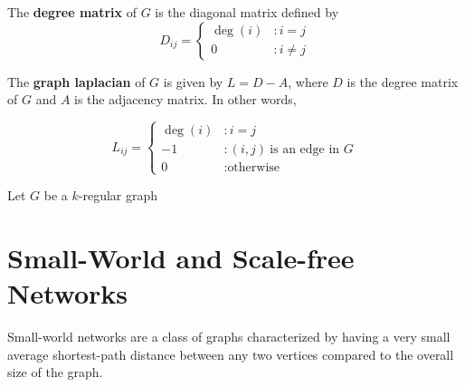 \begin{definition}
  The \textbf{degree matrix} of $G$ is the diagonal matrix defined by
  \[
    D_{ij} = \begin{cases}
      \deg(i) &: i = j \\
      0 &: i \neq j
    \end{cases}
  \]
\end{definition}

\begin{definition}
  The \textbf{graph laplacian} of $G$ is given by $L = D - A$, where $D$ is the
  degree matrix of $G$ and $A$ is the adjacency matrix. In other words,

  \[
    L_{ij} = \begin{cases}
      \deg(i) &: i=j \\
      -1 &: (i,j) ~\text{is an edge in $G$} \\
      0 &: \text{otherwise}
    \end{cases}
  \]
\end{definition}

\begin{proposition}
  Let $G$ be a $k$-regular graph
\end{proposition}








\section{Small-World and Scale-free Networks}
\label{sec:small_world}

Small-world networks are a class of graphs characterized by having a very small
average shortest-path distance between any two vertices compared to the overall
size of the graph.


